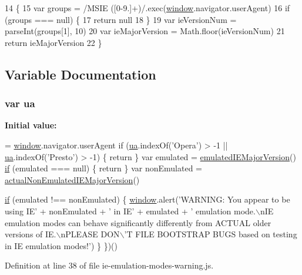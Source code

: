 \begin{DoxyCode}
14                                     \{
15     var groups = /MSIE ([0-9.]+)/.exec(\hyperlink{ripples_8js_a04a8a2bbfa9c15500892b8e5033d625b}{window}.navigator.userAgent)
16     \textcolor{keywordflow}{if} (groups === null) \{
17       \textcolor{keywordflow}{return} null
18     \}
19     var ieVersionNum = parseInt(groups[1], 10)
20     var ieMajorVersion = Math.floor(ieVersionNum)
21     return ieMajorVersion
22   \}
\end{DoxyCode}


\subsection{Variable Documentation}
\subsubsection[{\texorpdfstring{ua}{ua}}]{\setlength{\rightskip}{0pt plus 5cm}var ua}\hypertarget{ie-emulation-modes-warning_8js_a77a824a514e5c023c3617f2f740c707e}{}\label{ie-emulation-modes-warning_8js_a77a824a514e5c023c3617f2f740c707e}
{\bfseries Initial value\+:}
\begin{DoxyCode}
= \hyperlink{ripples_8js_a04a8a2bbfa9c15500892b8e5033d625b}{window}.navigator.userAgent
  \textcolor{keywordflow}{if} (\hyperlink{ie-emulation-modes-warning_8js_a77a824a514e5c023c3617f2f740c707e}{ua}.indexOf(\textcolor{stringliteral}{'Opera'}) > -1 || \hyperlink{ie-emulation-modes-warning_8js_a77a824a514e5c023c3617f2f740c707e}{ua}.indexOf(\textcolor{stringliteral}{'Presto'}) > -1) \{
    \textcolor{keywordflow}{return} 
  \}
  var emulated = \hyperlink{ie-emulation-modes-warning_8js_a0d49bb3ac3a67ced06fe8828d80f09d3}{emulatedIEMajorVersion}()
  \hyperlink{bootstrap_8min_8js_aa902c7649ec0f5d8953e7e191138fde2}{if} (emulated === null) \{
    \textcolor{keywordflow}{return} 
  \}
  var nonEmulated = \hyperlink{ie-emulation-modes-warning_8js_a57d09af6df991e1d9995cbd34d71cf55}{actualNonEmulatedIEMajorVersion}()

  \hyperlink{bootstrap_8min_8js_aa902c7649ec0f5d8953e7e191138fde2}{if} (emulated !== nonEmulated) \{
    \hyperlink{ripples_8js_a04a8a2bbfa9c15500892b8e5033d625b}{window}.alert(\textcolor{stringliteral}{'WARNING: You appear to be using IE'} + nonEmulated + \textcolor{stringliteral}{' in IE'} + emulated + \textcolor{stringliteral}{'
       emulation mode.\(\backslash\)nIE emulation modes can behave significantly differently from ACTUAL older versions of IE.\(\backslash\)nPLEASE
       DON\(\backslash\)'T FILE BOOTSTRAP BUGS based on testing in IE emulation modes!'})
  \}
\})()
\end{DoxyCode}


Definition at line 38 of file ie-\/emulation-\/modes-\/warning.\+js.

